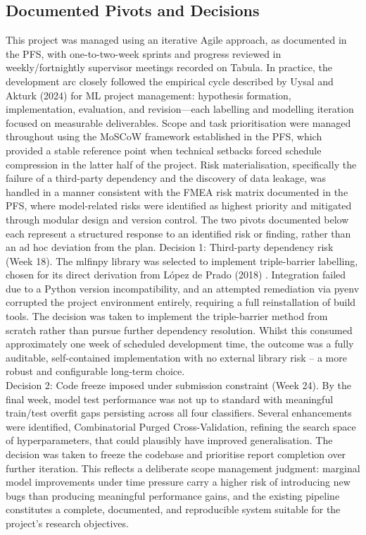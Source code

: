 \subsection{Documented Pivots and Decisions}
\label{subsec: Documented Pivots and Decision}
This project was managed using an iterative Agile approach, as documented in the PFS, with one-to-two-week sprints and progress reviewed in weekly/fortnightly supervisor meetings recorded on Tabula. In practice, the development arc closely followed the empirical cycle described by Uysal and Akturk (2024) for ML project management: hypothesis formation, implementation, evaluation, and revision—each labelling and modelling iteration focused on measurable deliverables. Scope and task prioritisation were managed throughout using the MoSCoW framework established in the PFS, which provided a stable reference point when technical setbacks forced schedule compression in the latter half of the project. Risk materialisation, specifically the failure of a third-party dependency and the discovery of data leakage, was handled in a manner consistent with the FMEA risk matrix documented in the PFS, where model-related risks were identified as highest priority and mitigated through modular design and version control. The two pivots documented below each represent a structured response to an identified risk or finding, rather than an ad hoc deviation from the plan.
Decision 1: Third-party dependency risk (Week 18). The mlfinpy library was selected to implement triple-barrier labelling, chosen for its direct derivation from López de Prado (2018) \cite{lopezdepradoAdvancesFinancialMachine2018}. Integration failed due to a Python version incompatibility, and an attempted remediation via pyenv corrupted the project environment entirely, requiring a full reinstallation of build tools. The decision was taken to implement the triple-barrier method from scratch rather than pursue further dependency resolution. Whilst this consumed approximately one week of scheduled development time, the outcome was a fully auditable, self-contained implementation with no external library risk -- a more robust and configurable long-term choice.\\
\noindent Decision 2: Code freeze imposed under submission constraint (Week 24). By the final week, model test performance was not up to standard with meaningful train/test overfit gaps persisting across all four classifiers. Several enhancements were identified, Combinatorial Purged Cross-Validation, refining the search space of hyperparameters, that could plausibly have improved generalisation. The decision was taken to freeze the codebase and prioritise report completion over further iteration. This reflects a deliberate scope management judgment: marginal model improvements under time pressure carry a higher risk of introducing new bugs than producing meaningful performance gains, and the existing pipeline constitutes a complete, documented, and reproducible system suitable for the project's research objectives.
